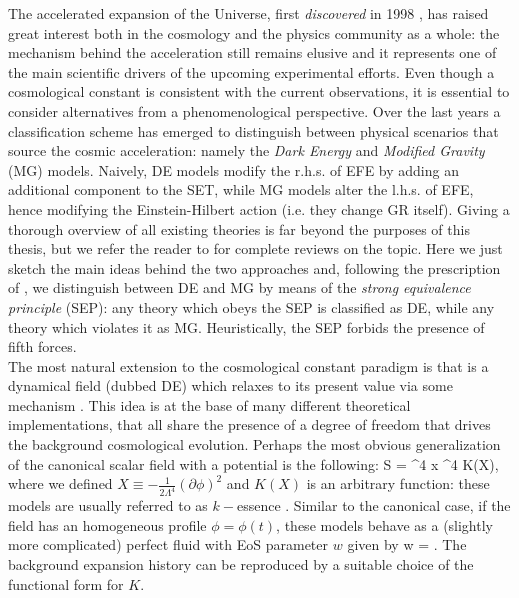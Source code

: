 %
The accelerated expansion of the Universe, first \emph{discovered} in 1998 \citep{Riess1998,Perlmutter1999}, 
has raised great interest
both in the cosmology and the physics community as a whole: the mechanism behind the acceleration
still remains elusive and it represents one of the main scientific drivers of the upcoming experimental 
efforts. Even though a cosmological constant is consistent with the current observations, it is essential
to consider alternatives from a phenomenological perspective. Over the last years a classification scheme
has emerged to distinguish between physical scenarios that source the cosmic acceleration: namely
the \emph{Dark Energy} and \emph{Modified Gravity} (MG) models. Naively, DE models
modify the r.h.s. of \gls{EFE} by adding an additional component to the \gls{SET}, while \gls{MG} models alter the l.h.s. of
\gls{EFE}, hence modifying the Einstein-Hilbert action (i.e. they change GR itself). 
Giving a thorough overview of all existing theories is far beyond the purposes of this thesis, 
but we refer the reader to \citet{Silvestri2009,Clifton2012} for complete reviews on the topic.  
Here we just sketch the main ideas behind the two approaches and, following the prescription of 
\citet{Joyce2016},
we distinguish between \gls{DE} and \gls{MG} by means of the \emph{strong equivalence principle} (SEP):  any
theory which obeys the SEP is classified as \gls{DE}, while any theory which violates it as MG. Heuristically,
the SEP forbids the presence of fifth forces.\\
The most natural extension to the cosmological constant paradigm is that is a dynamical field 
(dubbed \gls{DE}) which relaxes to its present value via some mechanism \citep{Wetterich1988, Ratra1988}.
This idea is at the base of many different theoretical implementations, that all share the presence of a
degree of freedom that  drives the background cosmological evolution. Perhaps the most obvious
generalization of the canonical scalar field with a potential is the following:
%
\be
S = \int \diff^4 x  \Lambda^4 K(X),
\ee
%
where we defined $X\equiv -\frac{1}{2\Lambda^4}(\partial \phi)^2$ and $K(X)$ is an arbitrary function:
these models are usually referred to as $k-$essence \citep{Chiba2000,Armendariz-Picon2000}. Similar to
the canonical case, if the field has an homogeneous profile $\phi=\phi(t)$, these models behave as a 
(slightly more complicated) perfect fluid with EoS parameter $w$ given by
%
\be
w = .
\ee
%
The background expansion history can be reproduced by a suitable choice of the functional form for $K$.
